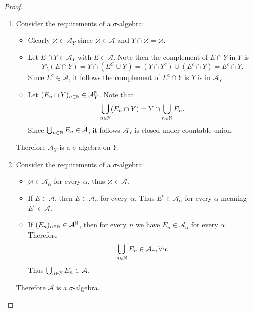 \documentclass[hw_all.tex]{subfiles}
\begin{document}
\begin{proof}
\begin{enumerate}
        \item 
            Consider the requirements of a $\sigma$-algebra:
            \begin{itemize}
                \item 
                    Clearly $\varnothing \in \mathcal{A}_Y$ since $\varnothing \in \mathcal{A}$ and $Y \cap \varnothing = \varnothing$.

                \item 
                    Let $E \cap Y \in \mathcal{A}_Y$ with $E \in \mathcal{A}$. Note then the complement of $E \cap Y$ in $Y$ is
                    \[
                        Y \setminus (E \cap Y) = Y \cap (E^C \cup Y) = (Y \cap Y^c) \cup (E^c \cap Y) = E^c \cap Y
                    .\]
                    Since $E^c \in \mathcal{A}$, it follows the complement of $E^c \cap Y$ is $Y$ is in $\mathcal{A}_Y$.

                \item 
                    Let $(E_n \cap Y)_{n \in \mathbb{N}} \in \mathcal{A}_Y^{\mathbb{N}}$. Note that
                    \[
                        \bigcup_{n \in \mathbb{N}} (E_n \cap Y) = Y \cap \bigcup_{n \in \mathbb{N}} E_n
                    .\]
                    Since $\bigcup_{n \in \mathbb{N}} E_n \in \mathcal{A}$, it follows $\mathcal{A}_Y$ is closed under countable union.
            \end{itemize}

            Therefore $\mathcal{A}_Y$ is a $\sigma$-algebra on $Y$.

        \item 
            Consider the requirements of a $\sigma$-algebra:

            \begin{itemize}
                \item 
                    $\varnothing \in \mathcal{A}_{\alpha}$ for every $\alpha$, thus $\varnothing \in \mathcal{A}$.

                \item 
                    If $E \in \mathcal{A}$, then $E \in \mathcal{A}_{\alpha}$ for every $\alpha$. Thus $E^c \in \mathcal{A}_{\alpha}$ for every $\alpha$ meaning $E^c \in \mathcal{A}$.

                \item 
                    If $(E_n)_{n \in \mathbb{N}} \in \mathcal{A}^{\mathbb{N}}$, then for every $n$ we have $E_n \in \mathcal{A}_{\alpha}$ for every $\alpha$. Therefore
                    \[
                        \bigcup_{n \in \mathbb{N}} E_n \in \mathcal{A}_{\alpha}, \forall \alpha
                    .\]
                    Thus $\bigcup_{n \in \mathbb{N}} E_n \in \mathcal{A}$.
            \end{itemize}

            Therefore $\mathcal{A}$ is a $\sigma$-algebra.
    \end{enumerate}
\end{proof}
\end{document}
